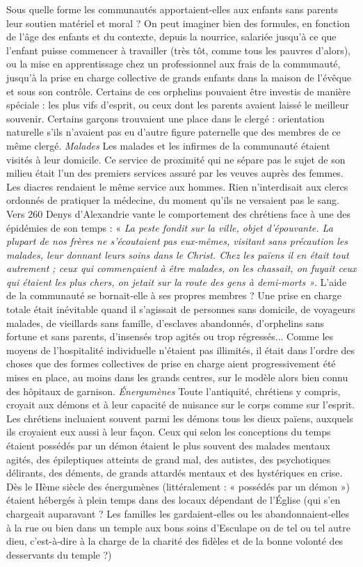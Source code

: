  Sous quelle forme les communautés apportaient-elles aux enfants sans parents leur soutien matériel et moral ? On peut imaginer bien des formules, en fonction de l'âge des enfants et du contexte, depuis la nourrice, salariée jusqu'à ce que l'enfant puisse commencer à travailler (très tôt, comme tous les pauvres d'alors), ou la mise en apprentissage chez un professionnel aux frais de la communauté, jusqu'à la prise en charge collective de grands enfants dans la maison de l'évêque et sous son contrôle. 
 Certains de ces orphelins pouvaient être investis de manière spéciale : les plus vifs d'esprit, ou ceux dont les parents avaient laissé le meilleur souvenir. Certains garçons trouvaient une place dans le clergé : orientation naturelle s'ils n'avaient pas eu d'autre figure paternelle que des membres de ce même clergé.
\emph{Malades
}Les malades et les infirmes de la communauté étaient visités à leur domicile. Ce service de proximité qui ne sépare pas le sujet de son milieu était l'un des premiers services assuré par les veuves auprès des femmes. Les diacres rendaient le même service aux hommes. Rien n'interdisait aux clercs ordonnés de pratiquer la médecine, du moment qu'ils ne versaient pas le sang. 
 Vers 260 Denys d'Alexandrie vante le comportement des chrétiens face à une des épidémies de son temps : « \emph{La peste fondit sur la ville, objet d'épouvante. La plupart de nos frères ne s'écoutaient pas eux-mêmes, visitant sans précaution les malades, leur donnant leurs soins dans le Christ. Chez les païens il en était tout autrement ; ceux qui commençaient à être malades, on les chassait, on fuyait ceux qui étaient les plus chers, on jetait sur la route des gens à demi-morts »}. L'aide de la communauté se bornait-elle à ses propres membres ? 
 Une prise en charge totale était inévitable quand il s'agissait de personnes sans domicile, de voyageurs malades, de vieillards sans famille, d'esclaves abandonnés, d'orphelins sans fortune et sans parents, d'insensés trop agités ou trop régressés... Comme les moyens de l'hospitalité individuelle n'étaient pas illimités, il était dans l'ordre des choses que des formes collectives de prise en charge aient progressivement été mises en place, au moins dans les grands centres, sur le modèle alors bien connu des hôpitaux de garnison. 
\emph{Énergumènes
}Toute l'antiquité, chrétiens y compris, croyait aux démons et à leur capacité de nuisance sur le corps comme sur l'esprit. Les chrétiens incluaient souvent parmi les démons tous les dieux païens, auxquels ils croyaient eux aussi à leur façon. Ceux qui selon les conceptions du temps étaient possédés par un démon étaient le plus souvent des malades mentaux agités, des épileptiques atteints de grand mal, des autistes, des psychotiques délirants, des déments, de grands attardés mentaux et des hystériques en crise. Dès le IIème siècle des énergumènes (littéralement : « possédés par un démon ») étaient hébergés à plein temps dans des locaux dépendant de l'Église (qui s'en chargeait auparavant ? Les familles les gardaient-elles ou les abandonnaient-elles à la rue ou bien dans un temple aux bons soins d'Esculape ou de tel ou tel autre dieu, c'est-à-dire à la charge de la charité des fidèles et de la bonne volonté des desservants du temple ?) 

